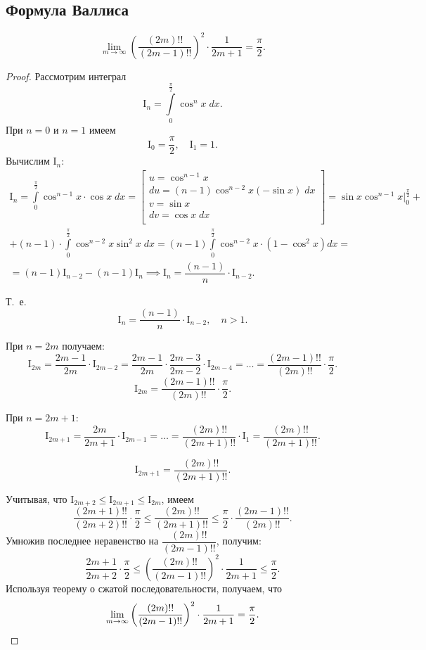 \documentclass[../../main.tex]{subfiles}
\begin{document}
\subsection{Формула Валлиса}

\begin{thm}
\[\boxed{
\lim\limits_{m \to \infty} \left( \dfrac{(2m)!!} {(2m-1)!!}  \right)^2
\cdot \dfrac{1}{2m+1} = \dfrac{\pi}{2}.
}\]
\end{thm}
\begin{proof}
Рассмотрим интеграл
\[
\mathrm{I}_n = \int\limits_0^{\frac{\pi}{2}} \cos^n x \;dx.\]
При $n = 0$ и $n = 1$ имеем
\[\mathrm{I}_0 = \dfrac{\pi}{2}, \quad \mathrm{I}_{1} = 1.
\]
Вычислим $\mathrm{I}_n$:
\begin{gather*}
\mathrm{I}_n =  \int\limits_0^{\frac{\pi}{2}} \cos^{n - 1} x \cdot \cos x\;dx =
\left[\begin{array}{l}
u = \cos^{n-1}x\\
du = (n - 1) \cos^{n-2}x (-\sin x) \;dx\\
v = \sin x \\
dv = \cos x\;dx\\
\end{array}\right]
= \sin x \cos^{n-1} x \Big|_0^{\frac{\pi}{2}} + 
\\
+ (n - 1) \cdot \int\limits_{0}^{\frac{\pi}{2}} \cos^{n-2}x \sin^2 x\; dx
= (n - 1) \int\limits_{0}^{\frac{\pi}{2}} \cos^{n-2}x \cdot (1 - \cos^{2}x)dx 
= \\
= (n-1)\mathrm{I}_{n-2} - (n-1)\mathrm{I}_{n} \implies 
\mathrm{I}_n = \dfrac{(n-1)}{n}\cdot\mathrm{I}_{n-2}.
\end{gather*}

Т.~е. \[\mathrm{I}_n = \dfrac{(n-1)}{n}\cdot\mathrm{I}_{n-2}, \quad n > 1.\]

При $n = 2m$ получаем:
\[
\mathrm{I}_{2m} = \dfrac{2m - 1}{2m} \cdot \mathrm{I}_{2m-2} = \dfrac{2m-1}{2m}
\cdot \dfrac{2m - 3}{2m-2} \cdot \mathrm{I}_{2m- 4} = \ldots =
\dfrac{(2m - 1)!!}{(2m)!!} \cdot \dfrac{\pi}{2}.
\]
\[\mathrm{I}_{2m} = \dfrac{(2m - 1)!!}{(2m)!!} \cdot \dfrac{\pi}{2}.\]

При $n = 2m+1$:
\[
\mathrm{I}_{2m + 1} = \dfrac{2m}{2m + 1} \cdot \mathrm{I}_{2m-1} = \ldots =
\dfrac{(2m)!!}{(2m + 1)!!} \cdot \mathrm{I}_{1} = \dfrac{(2m)!!}{(2m + 1)!!}.
\]

\[\mathrm{I}_{2m + 1} = \dfrac{(2m)!!}{(2m + 1)!!}.\]

Учитывая, что $
\mathrm{I}_{2m+2}\le \mathrm{I}_{2m+1}\le \mathrm{I}_{2m}
$, имеем
\[
\dfrac{(2m+1)!!}{(2m+2)!!} \cdot \dfrac{\pi}{2} \le \dfrac{(2m)!!}{(2m+1)!!} 
\le \dfrac{\pi}{2} \cdot \dfrac{(2m-1)!!}{(2m)!!}.
\]
Умножив последнее неравенство на $\dfrac{(2m)!!}{(2m-1)!!}$, получим:
\[
\dfrac{2m+1}{2m+2} \cdot \dfrac{\pi}{2} \le \left( \dfrac{(2m)!!}
{(2m-1)!!}  \right)^2 \cdot \dfrac{1}{2m+1} \le \dfrac{\pi}{2}.
\]
Используя теорему о сжатой последовательности, получаем, что
\[
\lim\limits_{m \to \infty} \left( \dfrac{(2m)!!} {(2m-1)!!}  \right)^2
\cdot \dfrac{1}{2m+1} = \dfrac{\pi}{2}. \qedhere
\]
\end{proof}
\end{document}
